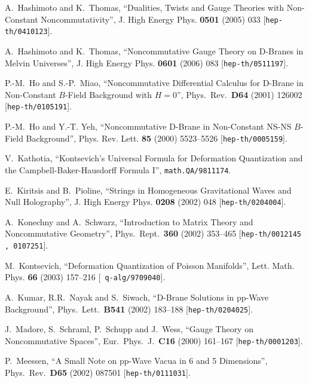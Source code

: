\documentclass[11pt,a4paper]{article}
\newcommand{\1}{\mathbb{1}}
\begin{document}
\begin{thebibliography}{99}
 A.~Hashimoto and K.~Thomas, ``Dualities, Twists and
  Gauge Theories with Non-Constant Noncommutativity'', J. High Energy
  Phys. {\bf 0501} (2005) 033 [{\tt hep-th/0410123}].

  A.~Hashimoto and K.~Thomas,
  ``Noncommutative Gauge Theory on D-Branes in Melvin Universes'',
  J. High Energy Phys. {\bf 0601} (2006) 083 [{\tt hep-th/0511197}].

  P.-M.~Ho and S.-P.~Miao,
  ``Noncommutative Differential Calculus for D-Brane in Non-Constant $B$-Field
  Background with $H=0$'',
  Phys.\ Rev.\  {\bf D64} (2001) 126002
  [{\tt hep-th/0105191}].

 P.-M.~Ho and Y.-T. Yeh, ``Noncommutative D-Brane in
  Non-Constant NS-NS $B$-Field Background'', Phys. Rev. Lett. {\bf 85}
  (2000) 5523--5526 [{\tt hep-th/0005159}].

 V.~Kathotia, ``Kontsevich's Universal Formula for
  Deformation Quantization and the Campbell-Baker-Hausdorff Formula
  I'', {\tt math.QA/9811174}.

 E.~Kiritsis and B.~Pioline, ``Strings in Homogeneous
  Gravitational Waves and Null Holography'', J. High Energy Phys. {\bf
    0208} (2002) 048 [{\tt hep-th/0204004}].

  A.~Konechny and A.~Schwarz,
  ``Introduction to Matrix Theory and Noncommutative Geometry'',
  Phys.\ Rept.\  {\bf 360} (2002) 353--465
  [{\tt hep-th/0012145 , 0107251}].

 M.~Kontsevich, ``Deformation Quantization of Poisson
  Manifolds'', Lett. Math. Phys. {\bf 66} (2003) 157--216 [{\tt
    q-alg/9709040}].

  A.~Kumar, R.R.~Nayak and S.~Siwach,
  ``D-Brane Solutions in pp-Wave Background'',
  Phys.\ Lett.\ {\bf B541} (2002) 183--188
  [{\tt hep-th/0204025}].

  J.~Madore, S.~Schraml, P.~Schupp and J.~Wess,
  ``Gauge Theory on Noncommutative Spaces'',
  Eur.\ Phys.\ J.\  {\bf C16} (2000) 161--167
  [{\tt hep-th/0001203}].

  P.~Meessen,
  ``A Small Note on pp-Wave Vacua in 6 and 5 Dimensions'',
  Phys.\ Rev.\ {\bf D65} (2002) 087501
  [{\tt hep-th/0111031}].


\end{thebibliography}
\end{document}
